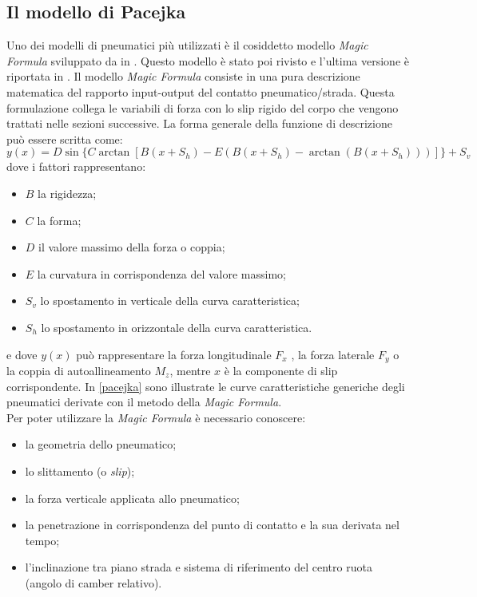 \subsection{Il modello di Pacejka}
Uno dei modelli di pneumatici più utilizzati è il cosiddetto modello \textit{Magic Formula} sviluppato da \citeauthor{bakker} in \cite{bakker}. Questo modello è stato poi rivisto e l'ultima versione è riportata in \cite{hans}. Il modello \textit{Magic Formula} consiste in una pura descrizione matematica del rapporto input-output del contatto pneumatico/strada. Questa formulazione collega le variabili di forza con lo slip rigido del corpo che vengono trattati nelle sezioni successive. La forma generale della funzione di descrizione può essere scritta come:
%
\begin{equation}
y(x) = D\sin\{C\arctan[B(x + S_h ) - E(B(x + S_h ) - \arctan(B(x + S_h )))]\} + S_v
\end{equation}
%
dove i fattori rappresentano:
\begin{itemize}
	\item $B$ la rigidezza;
	\item $C$ la forma;
	\item $D$ il valore massimo della forza o coppia;
	\item $E$ la curvatura in corrispondenza del valore massimo;
	\item $S_v$ lo spostamento in verticale della curva caratteristica;
	\item $S_h$ lo spostamento in orizzontale della curva caratteristica.
\end{itemize}
e dove $y(x)$ può rappresentare la forza longitudinale $F_x$ , la forza laterale $F_y$ o la coppia di autoallineamento $M_z$, mentre $x$ è la componente di slip corrispondente. In \figurename{ \ref{pacejka}} sono illustrate le curve caratteristiche generiche degli pneumatici derivate con il metodo della \textit{Magic Formula}.\\
Per poter utilizzare la \textit{Magic Formula} è necessario conoscere:
\begin{itemize}
	\item la geometria dello pneumatico;
	\item lo slittamento (o \textit{slip});
	\item la forza verticale applicata allo pneumatico;
	\item la penetrazione in corrispondenza del punto di contatto e la sua derivata nel tempo;
	\item l'inclinazione tra piano strada e sistema di riferimento del centro ruota (angolo di camber relativo).
\end{itemize}
